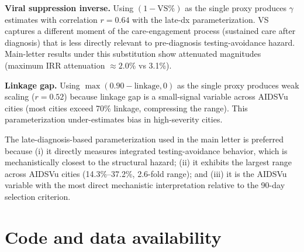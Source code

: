 \documentclass[11pt]{article}
\begin{document}
\textbf{Viral suppression inverse.} Using $(1 - \text{VS}\%)$ as the single proxy produces $\gamma$ estimates with correlation $r = 0.64$ with the late-dx parameterization. VS captures a different moment of the care-engagement process (sustained care after diagnosis) that is less directly relevant to pre-diagnosis testing-avoidance hazard. Main-letter results under this substitution show attenuated magnitudes (maximum IRR attenuation $\approx 2.0\%$ vs 3.1\%).

\textbf{Linkage gap.} Using $\max(0.90 - \text{linkage}, 0)$ as the single proxy produces weak scaling ($r = 0.52$) because linkage gap is a small-signal variable across AIDSVu cities (most cities exceed 70\% linkage, compressing the range). This parameterization under-estimates bias in high-severity cities.

The late-diagnosis-based parameterization used in the main letter is preferred because (i) it directly measures integrated testing-avoidance behavior, which is mechanistically closest to the structural hazard; (ii) it exhibits the largest range across AIDSVu cities (14.3\%--37.2\%, 2.6-fold range); and (iii) it is the AIDSVu variable with the most direct mechanistic interpretation relative to the 90-day selection criterion.

\section{Code and data availability}
\end{document}
